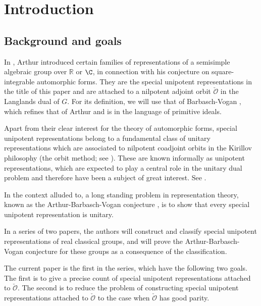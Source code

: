 \documentclass[12pt]{amsart}
\newcommand{\CO}{{\mathcal {O}}}
\newcommand{\R}{\mathbb R}
\numberwithin{equation}{section}
\theoremstyle{remark}
\begin{document}
\maketitle



\tableofcontents






\section{Introduction}\label{sec:intro}

\subsection{Background and goals} In \cite{ArPro,ArUni}, Arthur introduced certain families of representations of a semisimple algebraic group over $\R$ or $\C$, in connection with his conjecture on square-integrable automorphic forms. They are the special unipotent representations in the title of this paper and are attached to a nilpotent adjoint orbit $\check \CO$ in the Langlands dual of $G$. For its definition, we will use that of Barbasch-Vogan \cite{BVUni}, which refines that of Arthur and is in the language of primitive ideals.

Apart from their clear interest for the theory of automorphic forms, special unipotent representations belong to a fundamental class of unitary representations which are associated to nilpotent coadjoint orbits in
the Kirillov philosophy (the orbit method; see \cite{Ki62,Ko70,VoBook}). These are known informally as unipotent representations, which are expected to play a central role in the unitary dual problem and therefore have been a subject of great interest. See
\cite{VoICM,VoBook,Vo89}.

In the context alluded to, a long standing problem in representation theory, known as the Arthur-Barbasch-Vogan conjecture \cite[Introduction]{ABV}, is to show that every special unipotent representation is unitary.

In a series of two papers, the authors will construct and classify special unipotent representations of real classical groups, and will prove the Arthur-Barbasch-Vogan conjecture for these groups as a consequence of the classification.

The current paper is the first in the series, which have the following two goals. The first is to give a precise count of special unipotent representations attached to $\check \CO$. The second is to reduce the problem of constructing special unipotent representations attached to $\check \CO$ to the case when $\check \CO$ has good parity.
\end{document}

